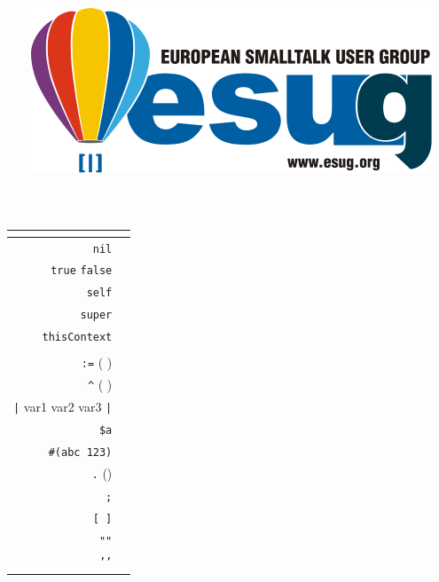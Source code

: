 \documentclass[notumble]{leaflet}
\title{
	\vfill
	\resizebox{\linewidth}{!}{\fontfamily{iwonac}\selectfont Smalltalk}%
	\\[\baselineskip]
	\normalfont
        \stSmalltalkSubtitle
        \\
	\vfill
	\includegraphics[width=\textwidth]{esug}
}
\date{}
\newcommand{\code}[1]{\foreignlanguage{english}{\texttt{#1}}}
\begin{document}
\maketitle
\thispagestyle{empty}

\pagebreak{}

\section{\stSmalltalkConceptsTerm}

\stSmalltalkConceptsDefinition

\subsection{\stSmalltalkSyntaxTerm}

\noindent
\begin{tabularx}{\linewidth}{@{}rX@{}}
	\toprule
	\multicolumn{2}{l}{\stReservedWordsTerm}\\
	\midrule
	\code{nil} & \stNilDefinition\\
	\code{true} \stAndTerm{} \code{false} & \stTrueAndFalseDefinition\\
	\code{self} & \stSelfDefinition\\
	\code{super} & \stSuperDefinition\\
	\code{thisContext} & \stThisContextDefinition\\
	\addlinespace

	\toprule
	\multicolumn{2}{l}{\stReservedCaractersTerm}\\
	\midrule
	\code{:=} (\stOrTerm{} \code{\textleftarrow}) & \stAssignmentOperatorDefinition \\
	\code{\^} (\stOrTerm{} \code{\textuparrow}) & \stReturnOperatorDefinition \\
	\code{|} var1 var2 var3 \code{|} & \stTempsDeclarationOperatorDefinition \\
	\code{\$a} & \stDollarOperatorForCharacterADefinition \\
	\code{\#(abc 123)} & \stLiteralArrayDefinition \\
	\code{.} (\stPeriodTerm) & \stDotOperatorDefinition \\
	\code{;} & \stSemiColonOperatorDefinition \\
	\code{[ ]} & \stBlockOperatorDefinition \\
	\code{"}\stCommentTerm\code{"} & \\
	\code{'}\stStringTerm\code{'} & \\
	\bottomrule
\end{tabularx}
\end{document}
